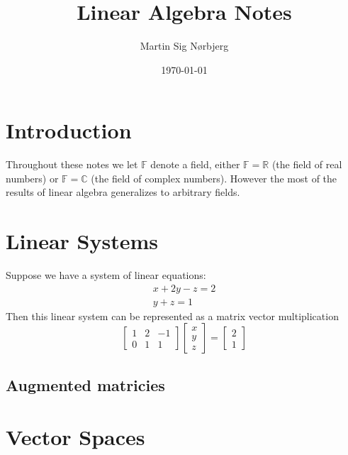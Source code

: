 \documentclass[11pt,a4paper,oneside,openright,english]{article}
\title{Linear Algebra Notes}
\author{Martin Sig Nørbjerg}
\date{\today}
\begin{document}
\maketitle
\tableofcontents


\section{Introduction}
Throughout these notes we let $\mathbb{F}$ denote a field, either $\mathbb{F} = \mathbb{R}$ (the field of real numbers) or $\mathbb{F} = \mathbb{C}$ (the field of complex numbers). However the most of the results of linear algebra generalizes to arbitrary fields.


\section{Linear Systems}
Suppose we have a system of linear equations:
\begin{align*}
  x + 2y - z = 2 \\
  y  + z = 1
\end{align*}
Then this linear system can be represented as a matrix vector multiplication
\begin{equation*}
  \begin{bmatrix} 1 & 2 & -1 \\ 0 & 1 & 1 \end{bmatrix} \begin{bmatrix} x \\ y \\ z \end{bmatrix} = \begin{bmatrix} 2 \\ 1 \end{bmatrix}
\end{equation*}
\subsection{Augmented matricies}


\section{Vector Spaces}
\end{document}
